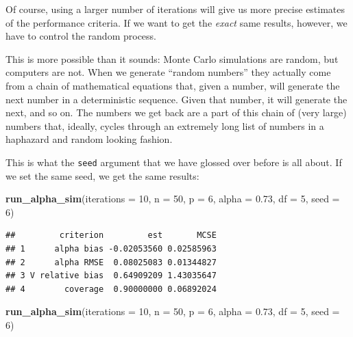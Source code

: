 \documentclass[
]{book}
\newenvironment{Shaded}{\begin{snugshade}}{\end{snugshade}}
\newcommand{\AttributeTok}[1]{\textcolor[rgb]{0.13,0.29,0.53}{#1}}
\newcommand{\DecValTok}[1]{\textcolor[rgb]{0.00,0.00,0.81}{#1}}
\newcommand{\FloatTok}[1]{\textcolor[rgb]{0.00,0.00,0.81}{#1}}
\newcommand{\FunctionTok}[1]{\textcolor[rgb]{0.13,0.29,0.53}{\textbf{#1}}}
\newcommand{\NormalTok}[1]{#1}
\begin{document}
Of course, using a larger number of iterations will give us more precise estimates of the performance criteria. If we want to get the \emph{exact} same results, however, we have to control the random process.

This is more possible than it sounds: Monte Carlo simulations are random, but computers are not.
When we generate ``random numbers'' they actually come from a chain of mathematical equations that, given a number, will generate the next number in a deterministic sequence.
Given that number, it will generate the next, and so on.
The numbers we get back are a part of this chain of (very large) numbers that, ideally, cycles through an extremely long list of numbers in a haphazard and random looking fashion.

This is what the \texttt{seed} argument that we have glossed over before is all about.
If we set the same seed, we get the same results:

\begin{Shaded}
\begin{Highlighting}[]
\FunctionTok{run\_alpha\_sim}\NormalTok{(}\AttributeTok{iterations =} \DecValTok{10}\NormalTok{, }\AttributeTok{n =} \DecValTok{50}\NormalTok{, }\AttributeTok{p =} \DecValTok{6}\NormalTok{, }\AttributeTok{alpha =} \FloatTok{0.73}\NormalTok{, }\AttributeTok{df =} \DecValTok{5}\NormalTok{,}
              \AttributeTok{seed =} \DecValTok{6}\NormalTok{)}
\end{Highlighting}
\end{Shaded}

\begin{verbatim}
##         criterion         est       MCSE
## 1      alpha bias -0.02053560 0.02585963
## 2      alpha RMSE  0.08025083 0.01344827
## 3 V relative bias  0.64909209 1.43035647
## 4        coverage  0.90000000 0.06892024
\end{verbatim}

\begin{Shaded}
\begin{Highlighting}[]
\FunctionTok{run\_alpha\_sim}\NormalTok{(}\AttributeTok{iterations =} \DecValTok{10}\NormalTok{, }\AttributeTok{n =} \DecValTok{50}\NormalTok{, }\AttributeTok{p =} \DecValTok{6}\NormalTok{, }\AttributeTok{alpha =} \FloatTok{0.73}\NormalTok{, }\AttributeTok{df =} \DecValTok{5}\NormalTok{, }
              \AttributeTok{seed =} \DecValTok{6}\NormalTok{)}
\end{Highlighting}
\end{Shaded}
\end{document}
